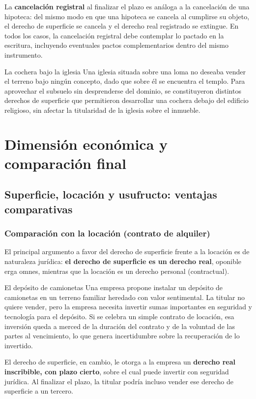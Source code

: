 \documentclass[12pt,oneside]{book}
\begin{document}
La \textbf{cancelación registral} al finalizar el plazo es análoga a la cancelación de una hipoteca: del mismo modo en que una hipoteca se cancela al cumplirse su objeto, el derecho de superficie se cancela y el derecho real registrado se extingue. En todos los casos, la cancelación registral debe contemplar lo pactado en la escritura, incluyendo eventuales pactos complementarios dentro del mismo instrumento.

\begin{example}{La cochera bajo la iglesia}
Una iglesia situada sobre una loma no deseaba vender el terreno bajo ningún concepto, dado que sobre él se encuentra el templo. Para aprovechar el subsuelo sin desprenderse del dominio, se constituyeron distintos derechos de superficie que permitieron desarrollar una cochera debajo del edificio religioso, sin afectar la titularidad de la iglesia sobre el inmueble.
\end{example}

\chapter{Dimensión económica y comparación final}

\section{Superficie, locación y usufructo: ventajas comparativas}

\subsection{Comparación con la locación (contrato de alquiler)}

El principal argumento a favor del derecho de superficie frente a la locación es de naturaleza jurídica: \textbf{el derecho de superficie es un derecho real}, oponible erga omnes, mientras que la locación es un derecho personal (contractual).

\begin{example}{El depósito de camionetas}
Una empresa propone instalar un depósito de camionetas en un terreno familiar heredado con valor sentimental. La titular no quiere vender, pero la empresa necesita invertir sumas importantes en seguridad y tecnología para el depósito. Si se celebra un simple contrato de locación, esa inversión queda a merced de la duración del contrato y de la voluntad de las partes al vencimiento, lo que genera incertidumbre sobre la recuperación de lo invertido.

El derecho de superficie, en cambio, le otorga a la empresa un \textbf{derecho real inscribible, con plazo cierto}, sobre el cual puede invertir con seguridad jurídica. Al finalizar el plazo, la titular podría incluso vender ese derecho de superficie a un tercero.
\end{example}
\end{document}
